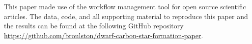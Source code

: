 \documentclass[twocolumn, linenumbers, astrosymb]{aastex631}
\begin{document}
\begin{acknowledgments} 
This paper made use of the \showyourwork workflow management tool for open source scientific articles. The data, code, and all supporting material to reproduce this paper and the results can be found at the following GitHub repository \url{https://github.com/broulston/dwarf-carbon-star-formation-paper}.
\end{acknowledgments}


{}

\end{document}
